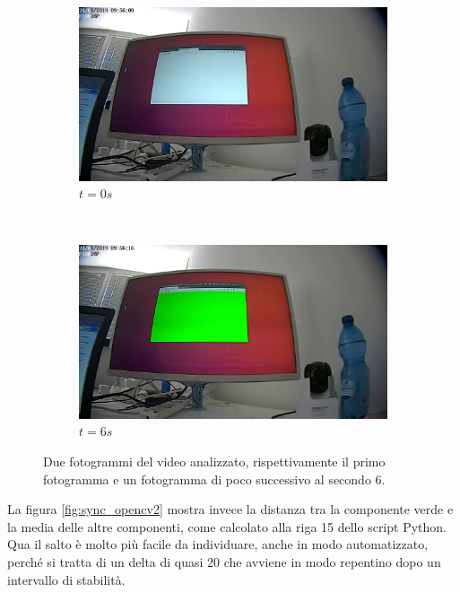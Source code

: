 \begin{figure}[htbp]
	\centering
	
	\begin{subfigure}[t]{0.5\textwidth}
		\centering
		\includegraphics[width=\textwidth]{res/opencv1.png}
		\caption{$t=0s$}
	\end{subfigure}%
	~ 
	\begin{subfigure}[t]{0.5\textwidth}
		\centering
		\includegraphics[width=\textwidth]{res/opencv2.png}
		\caption{$t=6s$}
	\end{subfigure}

	\caption{Due fotogrammi del video analizzato, rispettivamente il primo fotogramma e un fotogramma di poco successivo al secondo 6.}
	\label{fig:sync_video}
\end{figure}

La figura \ref{fig:sync_opencv2} mostra invece la distanza tra la componente verde e la media delle altre componenti, come calcolato alla riga 15 dello script Python. Qua il salto è molto più facile da individuare, anche in modo automatizzato, perché si tratta di un delta di quasi 20 che avviene in modo repentino dopo un intervallo di stabilità.

